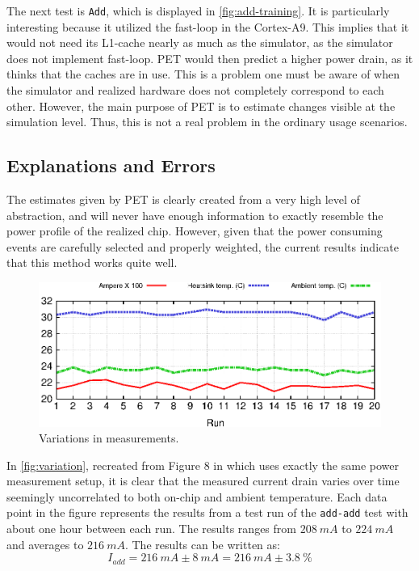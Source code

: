 The next test is \texttt{Add}, which is displayed in \autoref{fig:add-training}.
It is particularly interesting because it utilized the fast-loop in the
Cortex-A9. This implies that it would not need its L1-cache nearly as much as
the simulator, as the simulator does not implement fast-loop. PET would then
predict a higher power drain, as it thinks that the caches are in use. This is a
problem one must be aware of when the simulator and realized hardware does not
completely correspond to each other. However, the main purpose of PET is to
estimate changes visible at the simulation level. Thus, this is not a real
problem in the ordinary usage scenarios.


\subsection{Explanations and Errors}

The estimates given by PET is clearly created from a very high level of
abstraction, and will never have enough information to exactly resemble the
power profile of the realized chip. However, given that the power consuming
events are carefully selected and properly weighted, the current results
indicate that this method works quite well.

\begin{figure}[ht]
    \includegraphics{figs/heat}
    \caption{Variations in measurements.}
    \label{fig:variation}
\end{figure}

In \autoref{fig:variation}, recreated from Figure 8 in
\cite{rundehvatum2013exploring} which uses exactly the same power measurement
setup, it is clear that the measured current drain varies over time seemingly
uncorrelated to both on-chip and ambient temperature. Each data point in the
figure represents the results from a test run of the \texttt{add-add} test with
about one hour between each run. The results ranges from $208~mA$ to $224~mA$
and averages to $216~mA$. The results can be written as:
\[
    I_{add} = 216~mA\pm8~mA = 216~mA\pm3.8~\%
\]

